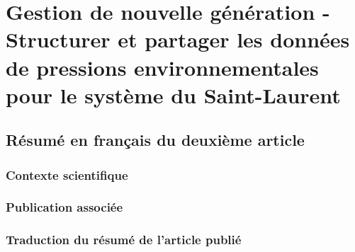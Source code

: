 \chapter{Gestion de nouvelle génération - Structurer et partager les données de pressions environnementales pour le système du Saint-Laurent}
\label{chap2}

\section{Résumé en français du deuxième article}

\subsection{Contexte scientifique}

\subsection{Publication associée}

\subsection{Traduction du résumé de l'article publié}
